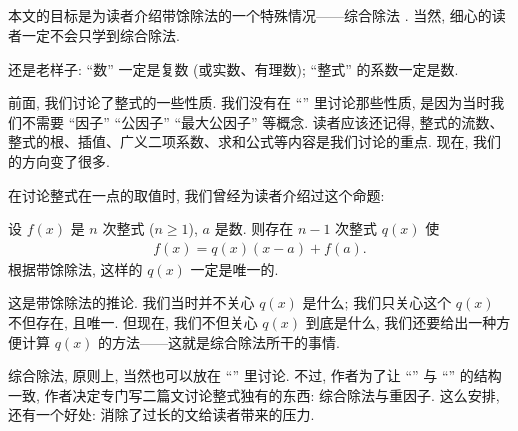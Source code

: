 \subsection*{\SyntheticDivision}
\markright{\SyntheticDivision}

本文的目标是为读者介绍带馀除法的一个特殊情况——综合除法 . 当然, 细心的读者一定不会只学到综合除法.

还是老样子: ``数'' 一定是复数 (或实数、有理数); ``整式'' 的系数一定是数.

前面, 我们讨论了整式的一些性质. 我们没有在 ``\HEADING'' 里讨论那些性质, 是因为当时我们不需要 ``因子'' ``公因子'' ``最大公因子'' 等概念. 读者应该还记得, 整式的流数、整式的根、插值、广义二项系数、求和公式等内容是我们讨论的重点. 现在, 我们的方向变了很多.

在讨论整式在一点的取值时, 我们曾经为读者介绍过这个命题:
\begin{proposition}
    设 $f(x)$ 是 $n$ 次整式 ($n \geq 1$), $a$ 是数. 则存在 $n-1$ 次整式 $q(x)$ 使
    \begin{align*}
        f(x) = q(x) (x-a) + f(a).
    \end{align*}
    根据带馀除法, 这样的 $q(x)$ 一定是唯一的.
\end{proposition}

这是带馀除法的推论. 我们当时并不关心 $q(x)$ 是什么; 我们只关心这个 $q(x)$ 不但存在, 且唯一. 但现在, 我们不但关心 $q(x)$ 到底是什么, 我们还要给出一种方便计算 $q(x)$ 的方法——这就是综合除法所干的事情.

综合除法, 原则上, 当然也可以放在 ``\SomePropertiesOfPolynomials'' 里讨论. 不过, 作者为了让 ``\SomePropertiesOfIntegers'' 与 ``\SomePropertiesOfPolynomials'' 的结构一致, 作者决定专门写二篇文讨论整式独有的东西: 综合除法与重因子. 这么安排, 还有一个好处: 消除了过长的文给读者带来的压力.

